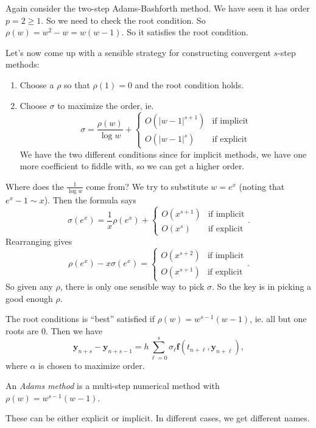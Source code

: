 \documentclass[a4paper]{article}
\begin{document}
\begin{eg}[AB2]
  Again consider the two-step Adams-Bashforth method. We have seen it has order $p = 2 \geq 1$. So we need to check the root condition. So $\rho(w) = w^2 - w = w(w - 1)$. So it satisfies the root condition.
\end{eg}

Let's now come up with a sensible strategy for constructing convergent $s$-step methods:
\begin{enumerate}
  \item Choose a $\rho$ so that $\rho(1) = 0$ and the root condition holds.
  \item Choose $\sigma$ to maximize the order, ie.
    \[
      \sigma = \frac{\rho(w)}{\log w} +
      \begin{cases}
        O(|w - 1|^{s + 1}) & \text{if implicit}\\
        O(|w - 1|^s) & \text{if explicit}
      \end{cases}
    \]
    We have the two different conditions since for implicit methods, we have one more coefficient to fiddle with, so we can get a higher order.
\end{enumerate}
Where does the $\frac{1}{\log w}$ come from? We try to substitute $w = e^x$ (noting that $e^x - 1\sim x$). Then the formula says
\[
  \sigma(e^x) = \frac{1}{x} \rho(e^x) +
  \begin{cases}
    O(x^{s + 1}) & \text{if implicit}\\
    O(x^s) & \text{if explicit}
  \end{cases}.
\]
Rearranging gives
\[
  \rho(e^x) -x \sigma (e^x) =
  \begin{cases}
    O(x^{s + 2}) & \text{if implicit}\\
    O(x^{s + 1}) & \text{if explicit}
  \end{cases}.
\]
So given any $\rho$, there is only one sensible way to pick $\sigma$. So the key is in picking a good enough $\rho$.

The root conditions is ``best'' satisfied if $\rho(w) = w^{s - 1}(w - 1)$, ie. all but one roots are $0$. Then we have
\[
  \mathbf{y}_{n + s} - \mathbf{y}_{n + s - 1} = h \sum_{\ell = 0}^s \sigma_\ell \mathbf{f}(t_{n + \ell}, \mathbf{y}_{n + \ell}),
\]
where $\alpha$ is chosen to maximize order.

\begin{defi}
  An \emph{Adams method} is a multi-step numerical method with $\rho(w) = w^{s - 1}(w - 1)$.
\end{defi}
These can be either explicit or implicit. In different cases, we get different names.
\end{document}
